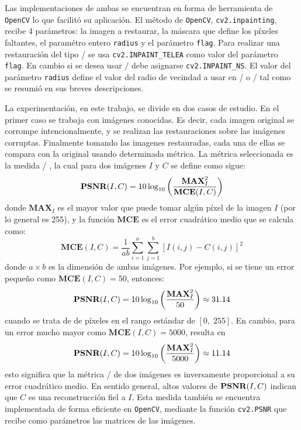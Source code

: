 Las implementaciones de ambas se encuentran en forma de herramienta de \texttt{OpenCV} lo que facilit\'o su aplicaci\'on. El m\'etodo de \texttt{OpenCV}, \texttt{cv2.inpainting}, recibe 4 par\'ametros: la imagen a restaurar, la m\'ascara que define los p\'ixeles faltantes, el param\'etro entero \texttt{radius} y el par\'ametro \texttt{flag}. Para realizar una restauraci\'on del tipo \TELEA/ se usa \texttt{cv2.INPAINT\_TELEA} como valor del par\'ametro \texttt{flag}. En cambio si se desea usar \NS/ debe asignarse \texttt{cv2.INPAINT\_NS}. El valor del par\'ametro \texttt{radius} define el valor del radio de vecindad a usar en \TELEA/ o \NS/ tal como se resumi\'o en sus breves descripciones.

La experimentaci\'on, en este trabajo, se divide en dos casos de estudio. En el primer caso se trabaja con im\'agenes conocidas. Es decir, cada imagen original se corrompe intencionalmente, y se realizan las restauraciones sobre las im\'agenes corruptas. Finalmente tomando las imagenes restauradas, cada una de ellas se compara con la original usando determinada m\'etrica. La m\'etrica seleccionada es la medida \PSNR/ \cite{enwiki:psnr}, la cual para dos im\'agenes $I$ y $C$ se define como sigue:
\begin{equation}
	\PSNR/(I, C) = 10 \log_{10} \left(\frac{\textbf{MAX}^2_I}{\textbf{MCE}(I, C)}\right)
\end{equation}
donde $\textbf{MAX}_I$ es el mayor valor que puede tomar alg\'un p\'ixel de la imagen $I$ (por lo general es 255), y la funci\'on $\textbf{MCE}$ es el error cuadr\'atico medio que se calcula como:
\begin{equation}
	\textbf{MCE}(I, C) = \frac{1}{ab}\sum_{i=1}^{a}\sum_{j=1}^{b}[I(i, j) - C(i, j)]^2
\end{equation}
donde $a \times b$ es la dimensi\'on de ambas im\'agenes. Por ejemplo, si se tiene un error pequeño como $\textbf{MCE}(I, C) = 50$, entonces: $$\PSNR/(I, C) = 10 \log_{10} \left(\frac{\textbf{MAX}^2_I}{50}\right) \approx 31.14$$ cuando se trata de de p\'ixeles en el rango est\'andar de $[0,\;255]$. En cambio, para un error mucho mayor como $\textbf{MCE}(I, C) = 5000$, resulta en $$\PSNR/(I, C) = 10 \log_{10} \left(\frac{\textbf{MAX}^2_I}{5000}\right) \approx 11.14$$ esto significa que la m\'etrica \PSNR/ de dos im\'agenes es inversamente proporcional a su error cuadr\'atico medio. En sentido general, altos valores de $\PSNR/(I, C)$ indican que $C$ es una reconstrucción fiel a $I$. Esta medida tambi\'en se encuentra implementada de forma eficiente en \texttt{OpenCV}, mediante la funci\'on \texttt{cv2.PSNR} que recibe como par\'ametros las matrices de las im\'agenes.

